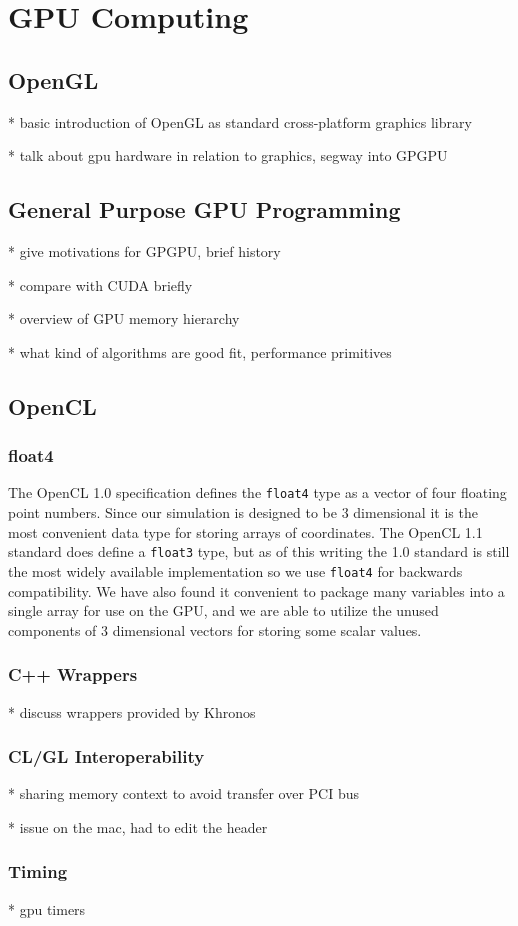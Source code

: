 \chapter{GPU Computing}

\section{OpenGL}
* basic introduction of OpenGL as standard cross-platform graphics library

* talk about gpu hardware in relation to graphics, segway into GPGPU

\section{General Purpose GPU Programming}

* give motivations for GPGPU, brief history

* compare with CUDA briefly

* overview of GPU memory hierarchy

* what kind of algorithms are good fit, performance primitives

\section{OpenCL}

\subsection{float4}
The OpenCL 1.0 specification defines the \verb|float4| type as a vector of four
floating point numbers. Since our simulation is designed to be 3 dimensional it
is the most convenient data type for storing arrays of coordinates. The OpenCL
1.1 standard does define a \verb|float3| type, but as of this writing the 1.0
standard is still the most widely available implementation so we use \verb|float4|
for backwards compatibility. We have also found it convenient to package many
variables into a single array for use on the GPU, and we are able to utilize
the unused components of 3 dimensional vectors for storing some scalar values.

\subsection{C++ Wrappers}
* discuss wrappers provided by Khronos

\subsection{CL/GL Interoperability}
* sharing memory context to avoid transfer over PCI bus

* issue on the mac, had to edit the header

\subsection{Timing}
* gpu timers


